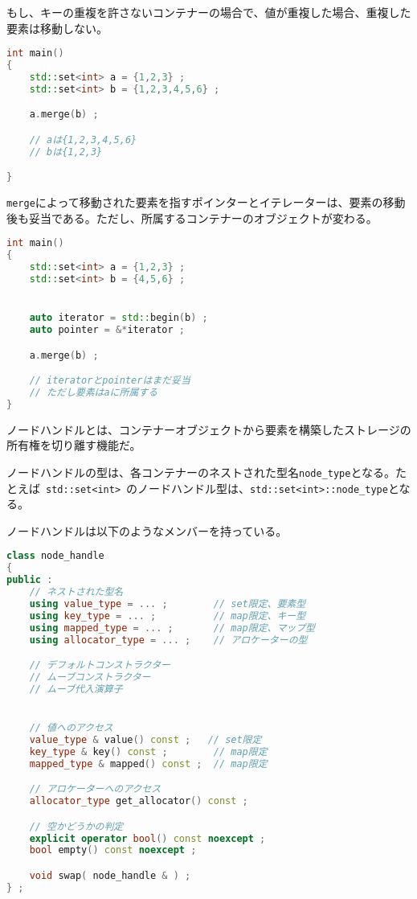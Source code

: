 もし、キーの重複を許さないコンテナーの場合で、値が重複した場合、重複した要素は移動しない。

\begin{lstlisting}[language=C++]
int main()
{
    std::set<int> a = {1,2,3} ;
    std::set<int> b = {1,2,3,4,5,6} ;

    a.merge(b) ;

    // aは{1,2,3,4,5,6}
    // bは{1,2,3}

}
\end{lstlisting}

\lstinline!merge!によって移動された要素を指すポインターとイテレーターは、要素の移動後も妥当である。ただし、所属するコンテナーのオブジェクトが変わる。

\begin{lstlisting}[language=C++]
int main()
{
    std::set<int> a = {1,2,3} ;
    std::set<int> b = {4,5,6} ;


    auto iterator = std::begin(b) ;
    auto pointer = &*iterator ;

    a.merge(b) ;

    // iteratorとpointerはまだ妥当
    // ただし要素はaに所属する
}
\end{lstlisting}

%

ノードハンドルとは、コンテナーオブジェクトから要素を構築したストレージの所有権を切り離す機能だ。

ノードハンドルの型は、各コンテナーのネストされた型名\lstinline!node_type!となる。たとえば~\lstinline!std::set<int>!~のノードハンドル型は、\lstinline!std::set<int>::node_type!となる。

ノードハンドルは以下のようなメンバーを持っている。

\begin{lstlisting}[language=C++]
class node_handle
{
public :
    // ネストされた型名
    using value_type = ... ;        // set限定、要素型
    using key_type = ... ;          // map限定、キー型
    using mapped_type = ... ;       // map限定、マップ型
    using allocator_type = ... ;    // アロケーターの型

    // デフォルトコンストラクター
    // ムーブコンストラクター
    // ムーブ代入演算子


    // 値へのアクセス
    value_type & value() const ;   // set限定
    key_type & key() const ;        // map限定
    mapped_type & mapped() const ;  // map限定

    // アロケーターへのアクセス
    allocator_type get_allocator() const ;

    // 空かどうかの判定
    explicit operator bool() const noexcept ;
    bool empty() const noexcept ;

    void swap( node_handle & ) ;
} ;
\end{lstlisting}

